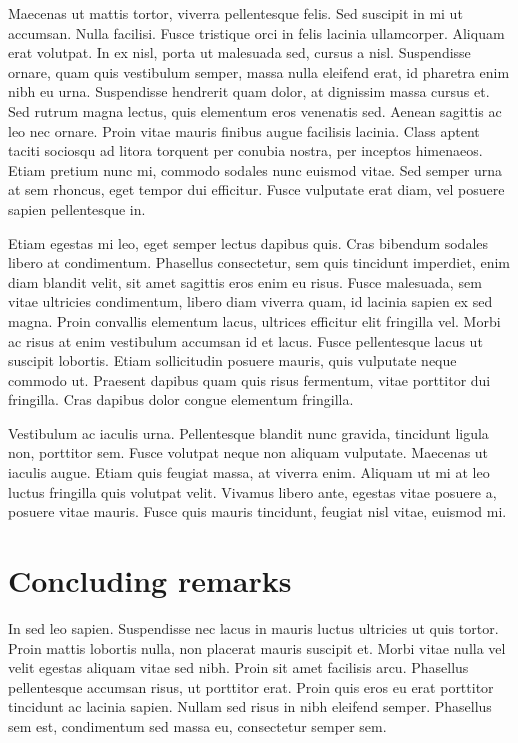 Maecenas ut mattis tortor, viverra pellentesque felis. Sed suscipit in mi ut accumsan. Nulla facilisi. Fusce tristique orci in felis lacinia ullamcorper. Aliquam erat volutpat. In ex nisl, porta ut malesuada sed, cursus a nisl. Suspendisse ornare, quam quis vestibulum semper, massa nulla eleifend erat, id pharetra enim nibh eu urna. Suspendisse hendrerit quam dolor, at dignissim massa cursus et. Sed rutrum magna lectus, quis elementum eros venenatis sed. Aenean sagittis ac leo nec ornare. Proin vitae mauris finibus augue facilisis lacinia. Class aptent taciti sociosqu ad litora torquent per conubia nostra, per inceptos himenaeos. Etiam pretium nunc mi, commodo sodales nunc euismod vitae. Sed semper urna at sem rhoncus, eget tempor dui efficitur. Fusce vulputate erat diam, vel posuere sapien pellentesque in.

Etiam egestas mi leo, eget semper lectus dapibus quis. Cras bibendum sodales libero at condimentum. Phasellus consectetur, sem quis tincidunt imperdiet, enim diam blandit velit, sit amet sagittis eros enim eu risus. Fusce malesuada, sem vitae ultricies condimentum, libero diam viverra quam, id lacinia sapien ex sed magna. Proin convallis elementum lacus, ultrices efficitur elit fringilla vel. Morbi ac risus at enim vestibulum accumsan id et lacus. Fusce pellentesque lacus ut suscipit lobortis. Etiam sollicitudin posuere mauris, quis vulputate neque commodo ut. Praesent dapibus quam quis risus fermentum, vitae porttitor dui fringilla. Cras dapibus dolor congue elementum fringilla.

Vestibulum ac iaculis urna. Pellentesque blandit nunc gravida, tincidunt ligula non, porttitor sem. Fusce volutpat neque non aliquam vulputate. Maecenas ut iaculis augue. Etiam quis feugiat massa, at viverra enim. Aliquam ut mi at leo luctus fringilla quis volutpat velit. Vivamus libero ante, egestas vitae posuere a, posuere vitae mauris. Fusce quis mauris tincidunt, feugiat nisl vitae, euismod mi.

\section{Concluding remarks}

In sed leo sapien. Suspendisse nec lacus in mauris luctus ultricies ut quis tortor. Proin mattis lobortis nulla, non placerat mauris suscipit et. Morbi vitae nulla vel velit egestas aliquam vitae sed nibh. Proin sit amet facilisis arcu. Phasellus pellentesque accumsan risus, ut porttitor erat. Proin quis eros eu erat porttitor tincidunt ac lacinia sapien. Nullam sed risus in nibh eleifend semper. Phasellus sem est, condimentum sed massa eu, consectetur semper sem.

